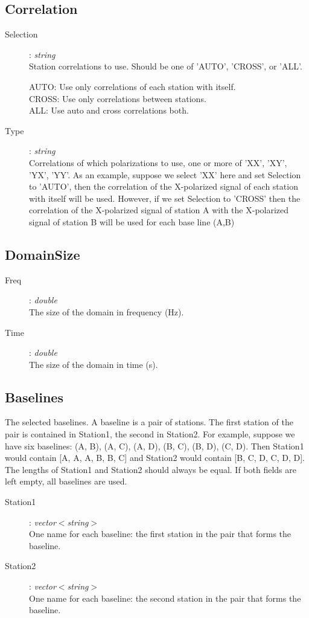 \documentclass[10pt]{lofar}
\begin{document}
\subsection*{Correlation}
\label{app-correlation}
\begin{description}
\item [Selection] : \emph{string} \\
    Station correlations to use. Should be one of 'AUTO', 'CROSS', or 'ALL'.
    \par
    AUTO: Use only correlations of each station with itself. \\
    CROSS: Use only correlations between stations. \\
    ALL: Use auto and cross correlations both.
\item [Type] : \emph{string} \\
    Correlations of which polarizations to use, one or more of 'XX', 'XY', 'YX',
    'YY'. As an example, suppose we select 'XX' here and set Selection to
    'AUTO', then the correlation of the X-polarized signal of each station with
    itself will be used. However, if we set Selection to 'CROSS' then the
    correlation of the X-polarized signal of station A with the X-polarized
    signal of station B will be used for each base line (A,B)
\end{description}

\subsection*{DomainSize}
\label{app-domainsize}
\begin{description}
\item [Freq] : \emph{double} \\
    The size of the domain in frequency (Hz).
\item [Time] : \emph{double} \\
    The size of the domain in time (s).
\end{description}

\subsection*{Baselines}
\label{app-baselines}
The selected baselines. A baseline is a pair of stations. The first station of
the pair is contained in Station1, the second in Station2. For example,
suppose we have six baselines: (A, B), (A, C), (A, D), (B, C), (B, D), (C,
D). Then Station1 would contain [A, A, A, B, B, C] and Station2 would contain
[B, C, D, C, D, D]. The lengths of Station1 and Station2 should always be
equal. If both fields are left empty, all baselines are used.
\begin{description}
\item [Station1] : \emph{vector$<$string$>$} \\
    One name for each baseline: the first station in the pair that forms the
    baseline.
\item [Station2] : \emph{vector$<$string$>$} \\
    One name for each baseline: the second station in the pair that forms the
    baseline.
\end{description}
\end{document}
